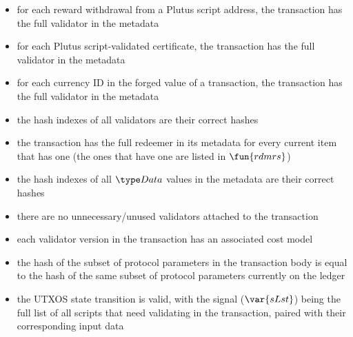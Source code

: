 \begin{itemize}
  \item for each reward withdrawal from a Plutus script address, the transaction
  has the full validator in the metadata

  \item for each Plutus script-validated certificate, the transaction
  has the full validator in the metadata

  \item for each currency ID in the forged value of a transaction, the transaction
  has the full validator in the metadata

  \item the hash indexes of all validators are their correct hashes

  \item the transaction has the full redeemer in its metadata for every current
  item that has one (the ones that have one are listed in $\fun{rdmrs}$)

  \item the hash indexes of all $\Data$ values in the metadata are their correct hashes

  \item there are no unnecessary/unused validators attached to the transaction

  \item each validator version in the transaction has an associated cost model

  \item
  the hash of the subset of protocol parameters in the transaction body is equal to
  the hash of the same subset of protocol parameters currently on the ledger

  \item the UTXOS state transition is valid, with the signal ($\var{sLst}$) being
  the full list of all scripts that need validating in the transaction, paired with
  their corresponding input data
\end{itemize}


